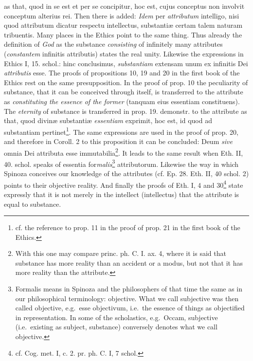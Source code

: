 \documentclass[12pt,a4paper,openany]{book}
\newcommand{\opage}[1]{\marginnote{\footnotesize\textit{[#1]}}}
\begin{document}
as that, quod in se est et per se concipitur, hoc est,
cujus conceptus non involvit conceptum alterius rei. Then there is
added: \emph{Idem} per \emph{attributum} intelligo, nisi quod attributum
dicatur respectu intellectus, substantiæ certam talem naturam
tribuentis. Many places in the Ethics point to the same thing. Thus
already the definition of \emph{God} as the substance \emph{consisting} of infinitely many
attributes (\emph{constantem} infinitis
attributis) states the real unity. Likewise the expressions in Ethics I, 15.
schol.: hinc conclusimus, \emph{substantiam} extensam unum ex infinitis
Dei \emph{attributis} esse. The proofs of propositions 10, 19 and 20 in the first book
of the Ethics rest on the same presupposition. In the proof of prop. 10
the peculiarity of substance, that it can be conceived through itself, is transferred
to the attribute as \emph{constituting the essence of the former} (tanquam eius
essentiam constituens). The \emph{eternity} of substance is transferred in prop.
19. demonstr. to the attribute as that, quod divinæ substantiæ \emph{essentiam}
exprimit, hoc est, id quod ad substantiam
pertinet\footnote{cf. the reference to prop. 11 in the proof of prop. 21
in the first book of the Ethics.}. The same expressions are used in the proof of prop. 20,
and therefore in Coroll. 2 to this proposition it can be concluded: Deum \emph{sive}
omnia Dei attributa esse immutabilia\footnote{With this one may
compare princ. ph. C. I. ax. 4, where it is said that substance has
more reality than an accident or a modus, but not that it
has more reality than the attribute.}. It leads to the same result when
Eth. II, 40. schol. speaks of essentia
\opage{49}\setcounter{footnote}{0}for\emph{malis}\footnote{Formalis means in Spinoza and the philosophers of that time
the same as in our philosophical terminology: objective. What we call
subjective was then called objective, e.g.\ esse objectivum, i.e.\ the
essence of things as objectified in representation. In some of the scholastics,
e.g.\ Occam, subjective (i.e.\ existing as subject,
substance) conversely denotes what we call objective.} attributorum. Likewise the
way in which Spinoza conceives our knowledge of the attributes (cf. Ep.
28. Eth. II, 40 schol. 2) points to their objective reality. And finally
the proofs of Eth. I, 4 and 30\footnote{cf. Cog. met. I, c. 2.
pr. ph. C. I, 7 schol.} state expressly that it is not merely in the
intellect (intellectus) that the attribute is equal to substance.
\end{document}
